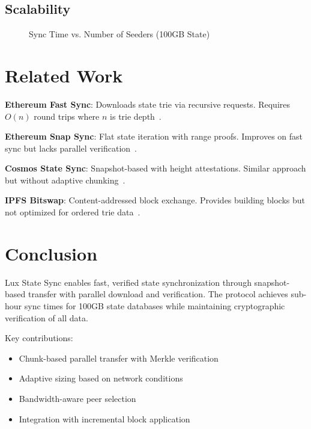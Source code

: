 \documentclass[11pt,a4paper]{article}
\begin{document}
\subsection{Scalability}

\begin{figure}[htbp]
\centering
{}
\caption{Sync Time vs. Number of Seeders (100GB State)}
\label{fig:scalability}
\end{figure}

\section{Related Work}

\textbf{Ethereum Fast Sync}: Downloads state trie via recursive requests. Requires $O(n)$ round trips where $n$ is trie depth~\cite{ethfastsync}.

\textbf{Ethereum Snap Sync}: Flat state iteration with range proofs. Improves on fast sync but lacks parallel verification~\cite{ethsnap}.

\textbf{Cosmos State Sync}: Snapshot-based with height attestations. Similar approach but without adaptive chunking~\cite{cosmos}.

\textbf{IPFS Bitswap}: Content-addressed block exchange. Provides building blocks but not optimized for ordered trie data~\cite{ipfs}.

\section{Conclusion}

Lux State Sync enables fast, verified state synchronization through snapshot-based transfer with parallel download and verification. The protocol achieves sub-hour sync times for 100GB state databases while maintaining cryptographic verification of all data.

Key contributions:
\begin{itemize}
    \item Chunk-based parallel transfer with Merkle verification
    \item Adaptive sizing based on network conditions
    \item Bandwidth-aware peer selection
    \item Integration with incremental block application
\end{itemize}
\end{document}
